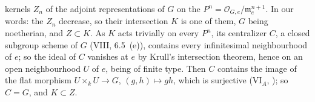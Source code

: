 kernels \(Z_n\) of the adjoint representations of \(G\) on the
\(P^n=\mathcal O_{G,e}/\mathfrak m_e^{n+1}\). In our words: the \(Z_n\) decrease, so their intersection \(K\) is
one of them, \(G\) being noetherian, and \(Z\subset K\). As \(K\) acts trivially on every \(P^n\), its centralizer
\(C\), a closed subgroup scheme of \(G\) (VIII, 6.5~(e)), contains every infinitesimal neighbourhood of \(e\); so
the ideal of \(C\) vanishes at \(e\) by Krull's intersection theorem, hence on an open neighbourhood \(U\) of \(e\),
being of finite type. Then \(C\) contains the image of the flat morphism \(U\times_kU\to G\), \((g,h)\mapsto gh\),
which is surjective (VI\(_A\), ); so \(C=G\), and \(K\subset Z\).
\par\medskip
